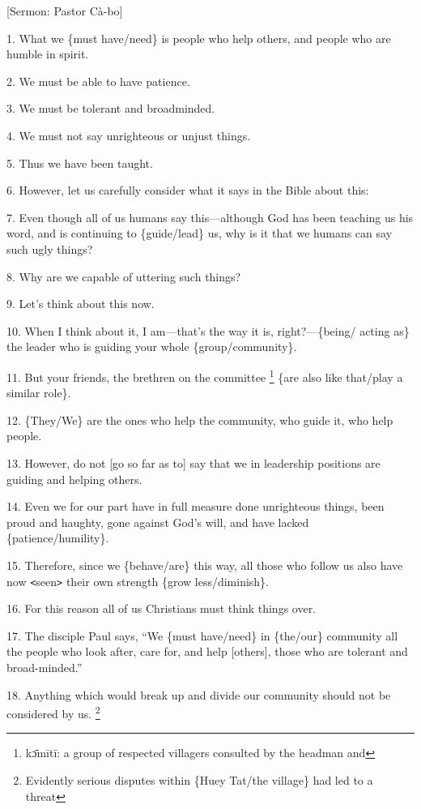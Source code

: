 
[Sermon: Pastor Cà-bo]

1. What we \{must have/need\} is people who help others, and people who are humble
in spirit.

2. We must be able to have patience.

3. We must be tolerant and broadminded.

4. We must not say unrighteous or unjust things.

5. Thus we have been taught.

6. However, let us carefully consider what it says in the Bible about this:

7. Even though all of us humans say this---although God has been teaching us his
word, and is continuing to \{guide/lead\} us, why is it that we humans can say
such ugly things?

8. Why are we capable of uttering such things?

9. Let's think about this now.

10. When I think about it, I am---that's the way it is, right?---\{being/ acting
as\} the leader who is guiding your whole \{group/community\}.

11. But your friends, the brethren on the committee \footnote{kɔ̄mītī: a group of respected villagers consulted by the headman and} \{are also like that/play
a similar role\}.

12. \{They/We\} are the ones who help the community, who guide it, who help people.

13. However, do not [go so far as to] say that we in leadership positions are guiding
and helping others.

14. Even we for our part have in full measure done unrighteous things, been proud
and haughty, gone against God's will, and have lacked \{patience/humility\}.

15. Therefore, since we \{behave/are\} this way, all those who follow us also have
now \texttt{<}seen\texttt{>} their own strength \{grow less/diminish\}.

16. For this reason all of us Christians must think things over.

17. The disciple Paul says, ``We \{must have/need\} in \{the/our\} community all
the people who look after, care for, and help [others], those who are tolerant
and broad-minded.''

18. Anything which would break up and divide our community should not be considered
by us. \footnote{Evidently serious disputes within \{Huey Tat/the village\} had led to a threat}

